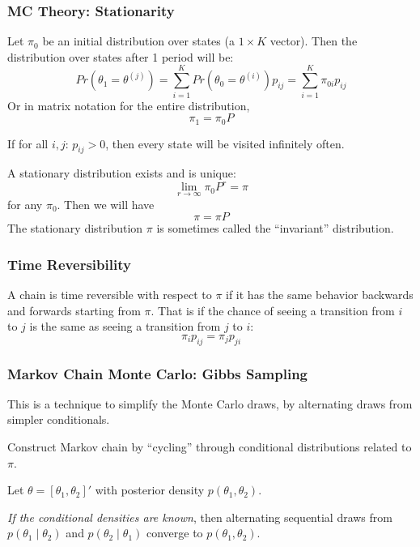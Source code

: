 \documentclass[11pt, aspectratio=169]{beamer}
\newenvironment{wideitemize}{\itemize\addtolength{\itemsep}{10pt}}{\enditemize}
\begin{document}
\begin{frame}[c]\frametitle{MC Theory: Stationarity}
    

Let $\pi_0$ be an initial distribution over states (a $1 \times K$ vector). Then the distribution over states after 1 period will be:
$$Pr( \theta_1 = \theta^{(j)}) = \sum_{i=1}^K Pr(\theta_0 = \theta^{(i)}) p_{ij} = \sum_{i=1}^K \pi_{0i} p_{ij} $$
Or in matrix notation for the entire distribution, 
$$\pi_1 = \pi_0 P$$

\vspace{.5em}
If for all $i,j$: $p_{ij} > 0$, then every state will be visited infinitely often.

\vspace{1em}
A stationary distribution exists and is unique:
$$ \lim_{r \rightarrow \infty} \pi_0P^r = \pi$$
for any $\pi_0$. Then we will have 
$$ \pi = \pi P $$
The stationary distribution $\pi$ is sometimes called the ``invariant'' distribution. 

\end{frame}


\begin{frame}[c]\frametitle{Time Reversibility}
    
\begin{definition} A chain is time reversible with respect to $\pi$ if it has the same behavior backwards and forwards starting from $\pi$. That is if the chance of seeing a transition from $i$ to $j$ is the same as seeing a transition from $j$ to $i$: 
$$ \pi_i p_{ij} = \pi_j p_{ji}$$
\end{definition}


\end{frame}



\begin{frame}[c]\frametitle{Markov Chain Monte Carlo: Gibbs Sampling}

  This is a technique to simplify the Monte Carlo draws, by alternating draws from simpler conditionals. 

  Construct Markov chain by ``cycling'' through conditional distributions related to $\pi$. 

\begin{wideitemize}
	\item Let $\theta = [\theta_1, \theta_2]'$ with posterior density $p(\theta_1, \theta_2)$.
	\item \emph{If the conditional densities are known}, then alternating sequential draws from $p(\theta_1 \mid \theta_2)$ and $p(\theta_2 \mid \theta_1)$ converge to $p(\theta_1, \theta_2)$.
\end{wideitemize}


\end{frame}
\end{document}
